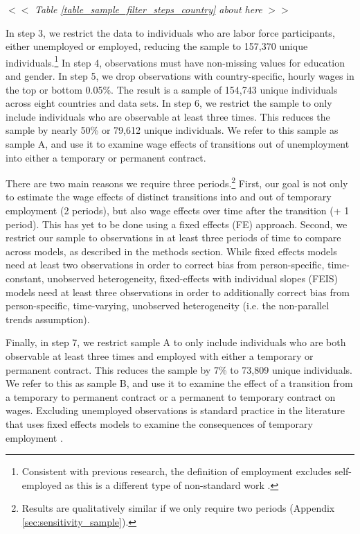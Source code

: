 \documentclass[12pt]{article}
\begin{document}
\begin{center}
$<<$ \emph{Table \ref{table_sample_filter_steps_country} about here} $>>$
\end{center}

In step 3, we restrict the data to individuals who are labor force participants, either unemployed or employed, reducing the sample to 157,370 unique individuals.\footnote{Consistent with previous research, the definition of employment excludes self-employed as this is a different type of non-standard work \citep{booth_temporary_2002,kalleberg_nonstandard_2000}.}  In step 4, observations must have non-missing values for education and gender.  In step 5, we drop observations with country-specific, hourly wages in the top or bottom 0.05\%.  The result is a sample of 154,743 unique individuals across eight countries and data sets. In step 6, we restrict the sample to only include individuals who are observable at least three times.  This reduces the sample by nearly 50\% or 79,612 unique individuals.  We refer to this sample as sample A, and use it to examine wage effects of transitions out of unemployment into either a temporary or permanent contract.  

There are two main reasons we require three periods.\footnote{Results are qualitatively similar if we only require two periods (Appendix \ref{sec:sensitivity_sample}).}  First, our goal is not only to estimate the wage effects of distinct transitions into and out of temporary employment (2 periods), but also wage effects over time after the transition (+ 1 period).  This has yet to be done using a fixed effects (FE) approach.  Second, we restrict our sample to observations in at least three periods of time to compare across models, as described in the methods section.  While fixed effects models need at least two observations in order to correct bias from person-specific, time-constant, unobserved heterogeneity, fixed-effects with individual slopes (FEIS) models need at least three observations in order to additionally correct bias from person-specific, time-varying, unobserved heterogeneity (i.e. the non-parallel trends assumption).  

Finally, in step 7, we restrict sample A to only include individuals who are both observable at least three times and employed with either a temporary or permanent contract.  This reduces the sample by 7\% to 73,809 unique individuals.  We refer to this as sample B, and use it to examine the effect of a transition from a temporary to permanent contract or a permanent to temporary contract on wages.  Excluding unemployed observations is standard practice in the literature that uses fixed effects models to examine the consequences of temporary employment \citep{barbieri_dual_2018,booth_temporary_2002,gebel_is_2013}.  
\end{document}
